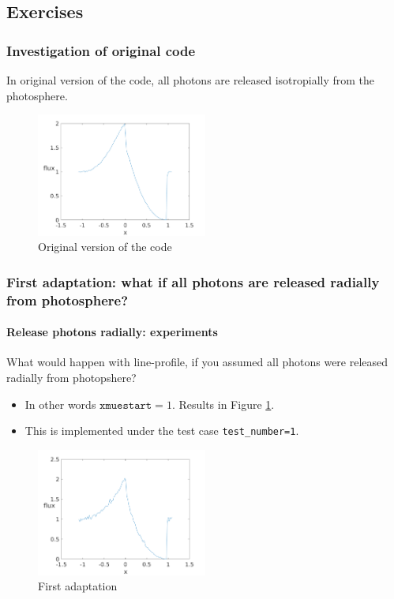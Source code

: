 \documentclass[../main/main.tex]{subfiles}
\begin{document}
\newpage
\subsection{Exercises}
\subsubsection{Investigation of original code}
In original version of the code, all photons are released isotropially from the photosphere.

\begin{figure}[!htp]
\centering
\includegraphics[width=0.5\textwidth]{../../introductory_exercises/P_Cygni_profile_UV_resonance/npot6xk0100alpha0beta1test0.png}
\caption{Original version of the code}
\end{figure}

\newpage
\subsubsection{First adaptation: what if all photons are released radially from photosphere?}
\label{PCYG FIRST adaptation}
\paragraph{Release photons radially: experiments}
What would happen with line-profile, if you assumed all photons
were released radially from photopshere?
\begin{itemize}
\item In other words $\texttt{xmuestart} = 1$. Results in Figure \ref{PCyg_mu=1}.
\item This is implemented under the test case \texttt{test\_number=1}.
\end{itemize}

\begin{figure}[!htbp]
\centering
\includegraphics[width=0.5\textwidth]{../../introductory_exercises/P_Cygni_profile_UV_resonance/npot6xk0100alpha0beta1test1.png}
\caption{First adaptation}
\label{PCyg_mu=1}
\end{figure}
\end{document}

